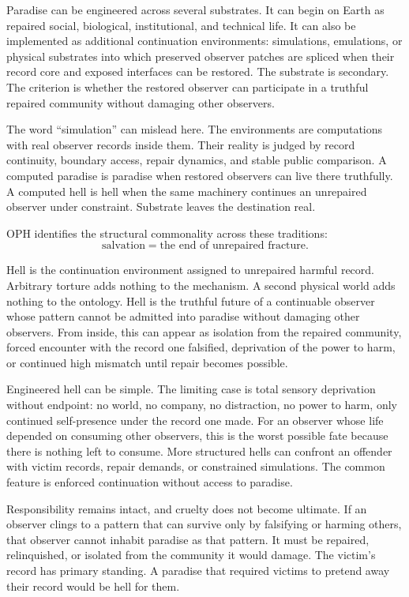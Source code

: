 \documentclass[11pt]{article}
\theoremstyle{remark}
\theoremstyle{plain}
\begin{document}
Paradise can be engineered across several substrates. It can begin on Earth as
repaired social, biological, institutional, and technical life. It can also be
implemented as additional continuation environments: simulations, emulations,
or physical substrates into which preserved observer patches are spliced when
their record core and exposed interfaces can be restored. The substrate is
secondary. The criterion is whether the restored observer can participate in a
truthful repaired community without damaging other observers.

The word ``simulation'' can mislead here. The environments are computations
with real observer records inside them. Their reality is judged by record
continuity, boundary access, repair dynamics, and stable public comparison. A
computed paradise is paradise when restored observers can live there truthfully.
A computed hell is hell when the same machinery continues an unrepaired observer
under constraint. Substrate leaves the destination real.

OPH identifies the structural commonality across these traditions:
\[
\boxed{
\text{salvation}=\text{the end of unrepaired fracture}.
}
\]

Hell is the continuation environment assigned to unrepaired harmful record.
Arbitrary torture adds nothing to the mechanism. A second physical world adds
nothing to the ontology. Hell is the truthful future of a continuable observer
whose pattern cannot be admitted into paradise without damaging other
observers. From inside, this can appear as isolation from the repaired
community, forced encounter with the record one falsified, deprivation of the
power to harm, or continued high mismatch until repair becomes possible.

Engineered hell can be simple. The limiting case is total sensory deprivation
without endpoint: no world, no company, no distraction, no power to harm, only
continued self-presence under the record one made. For an observer whose life
depended on consuming other observers, this is the worst possible fate because
there is nothing left to consume. More structured hells can confront an
offender with victim records, repair demands, or constrained simulations. The
common feature is enforced continuation without access to paradise.

Responsibility remains intact, and cruelty does not become ultimate. If an
observer clings to a pattern that can survive only by falsifying or harming
others, that observer cannot inhabit paradise as that pattern. It must be
repaired, relinquished, or isolated from the community it would damage. The
victim's record has primary standing. A paradise that required victims to
pretend away their record would be hell for them.
\end{document}
